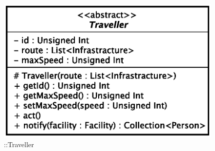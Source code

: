 \begin{figure}[h]
\centering
\includegraphics[scale=0.6,keepaspectratio]{images/solution/app/backend/traveller.eps}
\caption{\pActive::Traveller}
\label{fig:sd-app-traveller}
\end{figure}
\FloatBarrier
